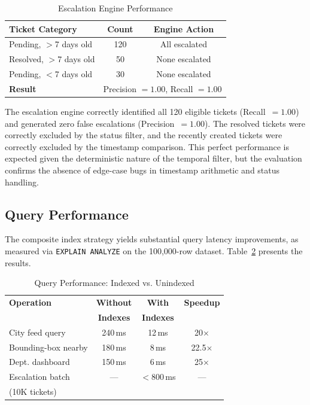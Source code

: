 \documentclass[conference]{IEEEtran}
\begin{document}
\begin{table}[htbp]
\caption{Escalation Engine Performance}
\begin{center}
\begin{tabular}{lcc}
\toprule
\textbf{Ticket Category} & \textbf{Count} & \textbf{Engine Action} \\
\midrule
Pending, $>$7 days old & 120 & All escalated \\
Resolved, $>$7 days old & 50 & None escalated \\
Pending, $<$7 days old & 30 & None escalated \\
\midrule
\textbf{Result} & \multicolumn{2}{c}{Precision $= 1.00$, Recall $= 1.00$} \\
\bottomrule
\end{tabular}
\label{tab:escalation}
\end{center}
\end{table}

The escalation engine correctly identified all 120 eligible tickets (Recall~$= 1.00$) and generated zero false escalations (Precision~$= 1.00$). The resolved tickets were correctly excluded by the status filter, and the recently created tickets were correctly excluded by the timestamp comparison. This perfect performance is expected given the deterministic nature of the temporal filter, but the evaluation confirms the absence of edge-case bugs in timestamp arithmetic and status handling.

\subsection{Query Performance}

The composite index strategy yields substantial query latency improvements, as measured via \texttt{EXPLAIN ANALYZE} on the 100{,}000-row dataset. Table~\ref{tab:qperf} presents the results.

\begin{table}[htbp]
\caption{Query Performance: Indexed vs. Unindexed}
\begin{center}
\begin{tabular}{lccc}
\toprule
\textbf{Operation} & \textbf{Without} & \textbf{With} & \textbf{Speedup} \\
 & \textbf{Indexes} & \textbf{Indexes} & \\
\midrule
City feed query & 240\,ms & 12\,ms & 20$\times$ \\
Bounding-box nearby & 180\,ms & 8\,ms & 22.5$\times$ \\
Dept. dashboard & 150\,ms & 6\,ms & 25$\times$ \\
Escalation batch & --- & $<$800\,ms & --- \\
\quad(10K tickets) & & & \\
\bottomrule
\end{tabular}
\label{tab:qperf}
\end{center}
\end{table}
\end{document}
